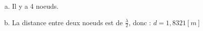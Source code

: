 %
%
    \begin{enumerate}[a)]
        \item Il y a 4 noeuds.
        \item La distance entre deux noeuds est de \(\frac{\lambda}{2}\), donc : \(d=1,8321[m]\)
    \end{enumerate}
